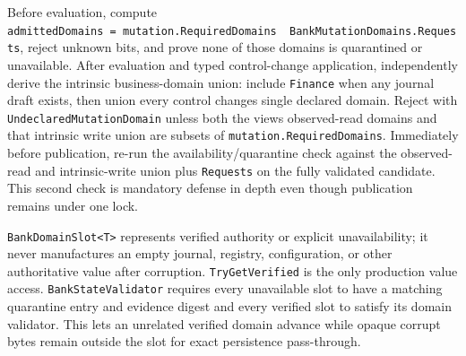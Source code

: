 \documentclass[
  10pt,
  letterpaper,
]{article}
\newcommand{\passthrough}[1]{#1}
\newcounter{none} %
\begin{document}
Before evaluation, compute
\texttt{admittedDomains\ }\allowbreak{}\texttt{=}\allowbreak{}\texttt{\ }\allowbreak{}\texttt{mutation.}\allowbreak{}\texttt{RequiredDomains\ }\allowbreak{}\texttt{\textbar{}}\allowbreak{}\texttt{\ }\allowbreak{}\texttt{BankMutationDomains.}\allowbreak{}\texttt{Requests},
reject unknown bits, and prove none of those domains is quarantined or
unavailable. After evaluation and typed control-change application,
independently derive the intrinsic business-domain union: include
\passthrough{\lstinline!Finance!} when any journal draft exists, then
union every control change\textquotesingle s single declared domain.
Reject with \texttt{UndeclaredMutationDomain} unless both the
view\textquotesingle s observed-read domains and that intrinsic write
union are subsets of
\texttt{mutation.}\allowbreak{}\texttt{RequiredDomains}. Immediately
before publication, re-run the availability/quarantine check against the
observed-read and intrinsic-write union plus
\passthrough{\lstinline!Requests!} on the fully validated candidate.
This second check is mandatory defense in depth even though publication
remains under one lock.

\passthrough{\lstinline!BankDomainSlot<T>!} represents verified
authority or explicit unavailability; it never manufactures an empty
journal, registry, configuration, or other authoritative value after
corruption. \passthrough{\lstinline!TryGetVerified!} is the only
production value access. \passthrough{\lstinline!BankStateValidator!}
requires every unavailable slot to have a matching quarantine entry and
evidence digest and every verified slot to satisfy its domain validator.
This lets an unrelated verified domain advance while opaque corrupt
bytes remain outside the slot for exact persistence pass-through.
\end{document}
